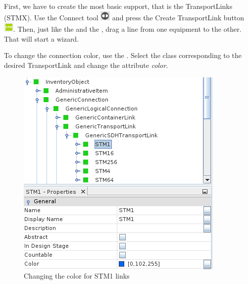 \documentclass[a4paper]{article}
\begin{document}
		First, we have to create the most basic support, that is the TransportLinks (STMX). Use the Connect tool \includegraphics[width=0.5cm]{img/icon_connect_tool.png} and press the Create TransportLink button \includegraphics[width=0.5cm]{img/sdh_module_transport_link.png}. Then, just like the  and the , drag a line from one equipment to the other. That will start a wizard.\newline
		
		To change the connection color, use the . Select the class corresponding to the desired TransportLink and change the attribute \textit{color}.
		\begin{figure}[h!]
			\centering
			\includegraphics[width=0.6\linewidth]{img/sdh_module_transport_link_color.png}
			\caption{Changing the color for STM1 links}
			\label{fig:sdh_module_transport_link_color}
		\end{figure}
		
\end{document}
